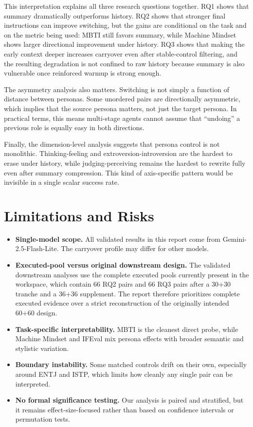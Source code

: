 \documentclass[11pt]{article}
\begin{document}
This interpretation explains all three research questions together.
RQ1 shows that summary dramatically outperforms history.
RQ2 shows that stronger final instructions can improve switching, but the gains are conditional on the task and on the metric being used: MBTI still favors summary, while Machine Mindset shows larger directional improvement under history.
RQ3 shows that making the early context deeper increases carryover even after stable-control filtering, and the resulting degradation is not confined to raw history because summary is also vulnerable once reinforced warmup is strong enough.

The asymmetry analysis also matters.
Switching is not simply a function of distance between personas.
Some unordered pairs are directionally asymmetric, which implies that the source persona matters, not just the target persona.
In practical terms, this means multi-stage agents cannot assume that ``undoing'' a previous role is equally easy in both directions.

Finally, the dimension-level analysis suggests that persona control is not monolithic.
Thinking-feeling and extroversion-introversion are the hardest to erase under history, while judging-perceiving remains the hardest to rewrite fully even after summary compression.
This kind of axis-specific pattern would be invisible in a single scalar success rate.

\section{Limitations and Risks}

\begin{itemize}[leftmargin=*]
    \item \textbf{Single-model scope.} All validated results in this report come from Gemini-2.5-Flash-Lite. The carryover profile may differ for other models.
    \item \textbf{Executed-pool versus original downstream design.} The validated downstream analyses use the complete executed pools currently present in the workspace, which contain 66 RQ2 pairs and 66 RQ3 pairs after a 30+30 tranche and a 36+36 supplement. The report therefore prioritizes complete executed evidence over a strict reconstruction of the originally intended 60+60 design.
    \item \textbf{Task-specific interpretability.} MBTI is the cleanest direct probe, while Machine Mindset and IFEval mix persona effects with broader semantic and stylistic variation.
    \item \textbf{Boundary instability.} Some matched controls drift on their own, especially around ENTJ and ISTP, which limits how cleanly any single pair can be interpreted.
    \item \textbf{No formal significance testing.} Our analysis is paired and stratified, but it remains effect-size-focused rather than based on confidence intervals or permutation tests.
\end{itemize}
\end{document}
